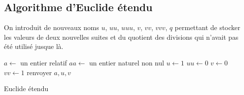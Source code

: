 \subsection{Algorithme d'Euclide étendu}
 On introduit de nouveaux noms $u$, $uu$, $uuu$, $v$, $vv$, $vvv$, $q$ permettant de stocker les valeurs de deux nouvelles suites et du quotient des divisions qui n'avait pas été utilisé jusque là.
\begin{algorithm}
  $a\leftarrow$ un entier relatif\;
  $aa\leftarrow$ un entier naturel non nul\;
  $u\leftarrow 1$\;
  $uu\leftarrow 0$\;
  $v\leftarrow 0$\;
  $vv\leftarrow 1$\;
  renvoyer $a, u, v$\;
 \caption{Euclide étendu}
 \label{C5546_3}
\end{algorithm}

